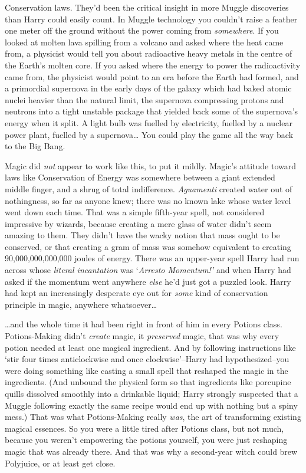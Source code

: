 Conservation laws. They'd been the critical insight in more Muggle discoveries than Harry could easily count. In Muggle technology you couldn't raise a feather one meter off the ground without the power coming from \emph{somewhere}. If you looked at molten lava spilling from a volcano and asked where the heat came from, a physicist would tell you about radioactive heavy metals in the centre of the Earth's molten core. If you asked where the energy to power the radioactivity came from, the physicist would point to an era before the Earth had formed, and a primordial supernova in the early days of the galaxy which had baked atomic nuclei heavier than the natural limit, the supernova compressing protons and neutrons into a tight unstable package that yielded back some of the supernova's energy when it split. A light bulb was fuelled by electricity, fuelled by a nuclear power plant, fuelled by a supernova{\ldots} You could play the game all the way back to the Big Bang.

Magic did \emph{not} appear to work like this, to put it mildly. Magic's attitude toward laws like Conservation of Energy was somewhere between a giant extended middle finger, and a shrug of total indifference. \emph{Aguamenti} created water out of nothingness, so far as anyone knew; there was no known lake whose water level went down each time. That was a simple fifth-year spell, not considered impressive by wizards, because creating a mere glass of water didn't seem amazing to them. They didn't have the wacky notion that mass ought to be conserved, or that creating a gram of mass was somehow equivalent to creating 90,000,000,000,000 joules of energy. There was an upper-year spell Harry had run across whose \emph{literal incantation} was `\emph{Arresto Momentum!'} and when Harry had asked if the momentum went anywhere \emph{else} he'd just got a puzzled look. Harry had kept an increasingly desperate eye out for \emph{some} kind of conservation principle in magic, anywhere whatsoever{\ldots}

{\ldots}and the whole time it had been right in front of him in every Potions class. Potions-Making didn't \emph{create} magic, it \emph{preserved} magic, that was why every potion needed at least one magical ingredient. And by following instructions like `stir four times anticlockwise and once clockwise'\---Harry had hypothesized\---you were doing something like casting a small spell that reshaped the magic in the ingredients. (And unbound the physical form so that ingredients like porcupine quills dissolved smoothly into a drinkable liquid; Harry strongly suspected that a Muggle following exactly the same recipe would end up with nothing but a spiny mess.) That was what Potions-Making really \emph{was}, the art of transforming existing magical essences. So you were a little tired after Potions class, but not much, because you weren't empowering the potions yourself, you were just reshaping magic that was already there. And that was why a second-year witch could brew Polyjuice, or at least get close.

